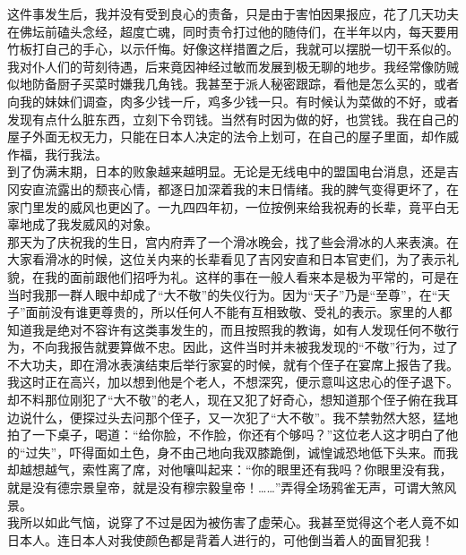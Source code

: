 这件事发生后，我并没有受到良心的责备，只是由于害怕因果报应，花了几天功夫在佛坛前磕头念经，超度亡魂，同时责令打过他的随侍们，在半年以内，每天要用竹板打自己的手心，以示仟悔。好像这样措置之后，我就可以摆脱一切干系似的。\\

我对仆人们的苛刻待遇，后来竟因神经过敏而发展到极无聊的地步。我经常像防贼似地防备厨子买菜时嫌我几角钱。我甚至于派人秘密跟踪，看他是怎么买的，或者向我的妹妹们调查，肉多少钱一斤，鸡多少钱一只。有时候认为菜做的不好，或者发现有点什么脏东西，立刻下令罚钱。当然有时因为做的好，也赏钱。我在自己的屋子外面无权无力，只能在日本人决定的法令上划可，在自己的屋子里面，却作威作福，我行我法。\\

到了伪满末期，日本的败象越来越明显。无论是无线电中的盟国电台消息，还是吉冈安直流露出的颓丧心情，都逐日加深着我的末日情绪。我的脾气变得更坏了，在家门里发的威风也更凶了。一九四四年初，一位按例来给我祝寿的长辈，竟平白无辜地成了我发威风的对象。\\

那天为了庆祝我的生日，宫内府弄了一个滑冰晚会，找了些会滑冰的人来表演。在大家看滑冰的时候，这位关内来的长辈看见了吉冈安直和日本官吏们，为了表示礼貌，在我的面前跟他们招呼为礼。这样的事在一般人看来本是极为平常的，可是在当时我那一群人眼中却成了“大不敬”的失仪行为。因为“天子”乃是“至尊”，在“天子”面前没有谁更尊贵的，所以任何人不能有互相致敬、受礼的表示。家里的人都知道我是绝对不容许有这类事发生的，而且按照我的教诲，如有人发现任何不敬行为，不向我报告就要算做不忠。因此，这件当时并未被我发现的“不敬”行为，过了不大功夫，即在滑冰表演结束后举行家宴的时候，就有个侄子在宴席上报告了我。我这时正在高兴，加以想到他是个老人，不想深究，便示意叫这忠心的侄子退下。却不料那位刚犯了“大不敬”的老人，现在又犯了好奇心，想知道那个侄子俯在我耳边说什么，便探过头去问那个侄子，又一次犯了“大不敬”。我不禁勃然大怒，猛地拍了一下桌子，喝道：“给你脸，不作脸，你还有个够吗？”这位老人这才明白了他的“过失”，吓得面如土色，身不由己地向我双膝跪倒，诚惶诚恐地低下头来。而我却越想越气，索性离了席，对他嚷叫起来：“你的眼里还有我吗？你眼里没有我，就是没有德宗景皇帝，就是没有穆宗毅皇帝！……”弄得全场鸦雀无声，可谓大煞风景。\\

我所以如此气恼，说穿了不过是因为被伤害了虚荣心。我甚至觉得这个老人竟不如日本人。连日本人对我使颜色都是背着人进行的，可他倒当着人的面冒犯我！\\

